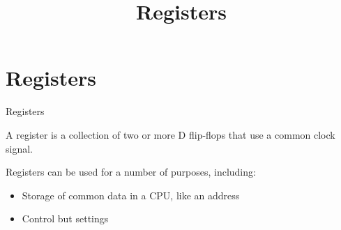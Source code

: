 \title{Registers}

\section{Registers}

\begin{frame}{Registers}
  \begin{definition}
    A \alert{register} is a collection of two or more D flip-flops that use a common clock signal.
  \end{definition}
  Registers can be used for a number of purposes, including:
  \begin{itemize}
    \item Storage of common data in a CPU, like an address
    \item Control but settings
  \end{itemize}
\end{frame}

